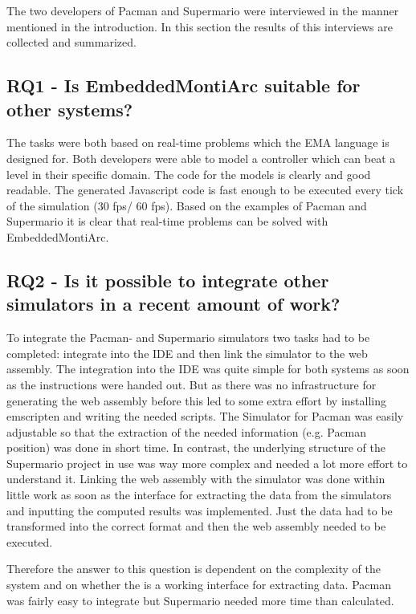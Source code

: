 The two developers of Pacman and Supermario were interviewed in the manner mentioned in the introduction. In this section the results of this interviews are collected and summarized.

\subsection{RQ1 - Is EmbeddedMontiArc suitable for other systems?}
The tasks were both based on real-time problems which the EMA language is designed for. Both developers were able to model a controller which can beat a level in their specific domain. The code for the models is clearly and good readable. The generated Javascript code is fast enough to be executed every tick of the simulation (30 fps/ 60 fps). Based on the examples of Pacman and Supermario it is clear that real-time problems can be solved with EmbeddedMontiArc.

\subsection{RQ2 - Is it possible to integrate other simulators in a recent amount of work?}
To integrate the Pacman- and Supermario simulators two tasks had to be completed: integrate into the IDE and then link the simulator to the web assembly. The integration into the IDE was quite simple for both systems as soon as the instructions were handed out. But as there was no infrastructure for generating the web assembly before this led to some extra effort by installing emscripten and writing the needed scripts. The Simulator for Pacman was easily adjustable so that the extraction of the needed information (e.g. Pacman position) was done in short time. In contrast, the underlying structure of the Supermario project in use was way more complex and needed a lot more effort to understand it. Linking the web assembly with the simulator was done within little work as soon as the interface for extracting the data from the simulators and inputting the computed results was implemented. Just the data had to be transformed into the correct format and then the web assembly needed to be executed.

Therefore the answer to this question is dependent on the complexity of the system and on whether the is a working interface for extracting data. Pacman was fairly easy to integrate but Supermario needed more time than calculated.

